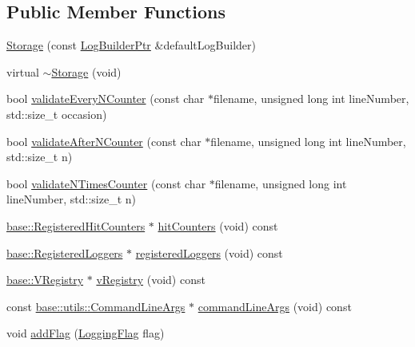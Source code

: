 \subsection*{Public Member Functions}
\begin{DoxyCompactItemize}
\item 
\hyperlink{classel_1_1base_1_1_storage_a4932a8f8a55c3b00467cf2feed6acf59}{Storage} (const \hyperlink{namespaceel_ad4c4b2f7d70a4b02568a9f70724a6b39}{Log\+Builder\+Ptr} \&default\+Log\+Builder)
\item 
virtual \hyperlink{classel_1_1base_1_1_storage_a4059a5073b5d73b8671b6c980929da95}{$\sim$\+Storage} (void)
\item 
bool \hyperlink{classel_1_1base_1_1_storage_ae99093b82b3f25b6baf5d3d8b00b27e5}{validate\+Every\+N\+Counter} (const char $\ast$filename, unsigned long int line\+Number, std\+::size\+\_\+t occasion)
\item 
bool \hyperlink{classel_1_1base_1_1_storage_ad93b7ae53a58a57b85db2dfb310406c6}{validate\+After\+N\+Counter} (const char $\ast$filename, unsigned long int line\+Number, std\+::size\+\_\+t n)
\item 
bool \hyperlink{classel_1_1base_1_1_storage_a141d7ef080be7eae11ac6201a538eec9}{validate\+N\+Times\+Counter} (const char $\ast$filename, unsigned long int line\+Number, std\+::size\+\_\+t n)
\item 
\hyperlink{classel_1_1base_1_1_registered_hit_counters}{base\+::\+Registered\+Hit\+Counters} $\ast$ \hyperlink{classel_1_1base_1_1_storage_accd5495cdad77254eb24ef8f75cd71ad}{hit\+Counters} (void) const 
\item 
\hyperlink{classel_1_1base_1_1_registered_loggers}{base\+::\+Registered\+Loggers} $\ast$ \hyperlink{classel_1_1base_1_1_storage_af0c2f1e119ac3f111f810a324b6b0d3a}{registered\+Loggers} (void) const 
\item 
\hyperlink{classel_1_1base_1_1_v_registry}{base\+::\+V\+Registry} $\ast$ \hyperlink{classel_1_1base_1_1_storage_a1ec05ca060ff169569b6ea86da1e30da}{v\+Registry} (void) const 
\item 
const \hyperlink{classel_1_1base_1_1utils_1_1_command_line_args}{base\+::utils\+::\+Command\+Line\+Args} $\ast$ \hyperlink{classel_1_1base_1_1_storage_a84f3d208bead8a8b2c15834be7f30f8d}{command\+Line\+Args} (void) const 
\item 
void \hyperlink{classel_1_1base_1_1_storage_a3e17c61961f3b2f45e8ec77e3320bed5}{add\+Flag} (\hyperlink{namespaceel_a2784aacd04cb7816ac1c0b20fcbf83cb}{Logging\+Flag} flag)
\item 

\end{DoxyCompactItemize}
